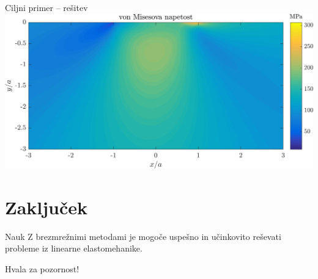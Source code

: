 \begin{frame}{Ciljni primer -- rešitev}
  \centering
  \vfill
  \includegraphics[width=\textwidth]{resources/fwo_solution.png}
  \vfill
\end{frame}

\section{Zaključek}
\begin{frame}
  \vfill
  \begin{block}{Nauk}
    Z brezmrežnimi metodami je mogoče uspešno in učinkovito reševati probleme iz linearne
    elastomehanike.
  \end{block}

  \vfill
  Hvala za pozornost!
\end{frame}
